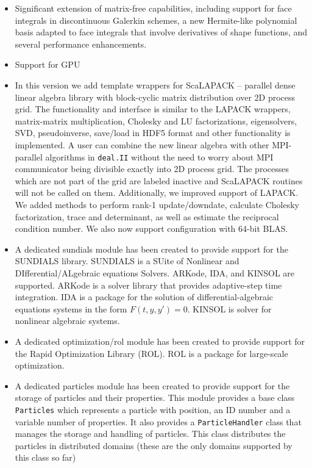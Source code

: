 \documentclass{ansarticle-preprint}
\newcommand{\specialword}[1]{\texttt{#1}}
\newcommand{\dealii}{{\specialword{deal.II}}}
\begin{document}
\begin{itemize}
\item
  Significant extension of matrix-free capabilities, including support for face
  integrals in discontinuous Galerkin schemes, a new Hermite-like polynomial
  basis adapted to face integrals that involve derivatives of shape functions,
  and several performance enhancements.

\item
  Support for GPU

\item
  In this version we add template wrappers for ScaLAPACK -- parallel dense linear algebra
  library with block-cyclic matrix distribution over 2D process grid.
  The functionality and interface is similar to the LAPACK wrappers,
  matrix-matrix multiplication, Cholesky and LU factorizations,
  eigensolvers, SVD, pseudoinverse, save/load in HDF5 format and
  other functionality is implemented.
  A user can combine the new linear algebra with other MPI-parallel
  algorithms in \dealii{} without the need to worry about MPI communicator
  being divisible exactly into 2D process grid. The processes which are not part of
  the grid are labeled inactive and ScaLAPACK routines will not be called on them.
  Additionally, we improved support of LAPACK. We added methods to perform
  rank-1 update/downdate, calculate Cholesky factorization, trace and determinant,
  as well as estimate the reciprocal condition number.
  We also now support configuration with 64-bit BLAS.

\item
  A dedicated sundials module has been created to provide support for the
  SUNDIALS library. SUNDIALS is a SUite of Nonlinear and
  DIfferential/ALgebraic equations Solvers. ARKode, IDA, and KINSOL are
  supported. ARKode is a solver library that provides adaptive-step time
  integration. IDA is a package for the solution of differential-algebraic
  equations systems in the form $F(t,y,y')=0$. KINSOL is solver for nonlinear
  algebraic systems.

\item
  A dedicated optimization/rol module has been created to provide support for
  the Rapid Optimization Library (ROL). ROL is a package for large-scale
  optimization.

\item
  A dedicated particles module has been created to provide support for the
  storage of particles and their properties. This module provides a base class
  \texttt{Particles} which represents a particle with position, an ID number and
  a variable number of properties. It also provides a \texttt{ParticleHandler}
  class that manages the storage and handling of particles. This class
  distributes the particles in distributed domains (these are the only domains
  supported by this class so far)


\end{itemize}
\end{document}
